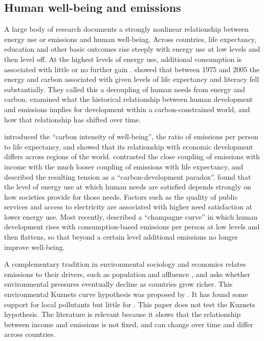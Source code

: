 \subsection{Human well-being and emissions}

A large body of research documents a strongly nonlinear relationship between energy use or emissions and human well-being. Across countries, life expectancy, education and other basic outcomes rise steeply with energy use at low levels and then level off. At the highest levels of energy use, additional consumption is associated with little or no further gain \citep{steinberger2010}. \citet{steinberger2010} showed that between 1975 and 2005 the energy and carbon associated with given levels of life expectancy and literacy fell substantially. They called this a decoupling of human needs from energy and carbon. \citet{lamb2015} examined what the historical relationship between human development and emissions implies for development within a carbon-constrained world, and how that relationship has shifted over time.

\citet{jorgenson2014} introduced the ``carbon intensity of well-being'', the ratio of emissions per person to life expectancy, and showed that its relationship with economic development differs across regions of the world. \citet{steinberger2020} contrasted the close coupling of emissions with income with the much looser coupling of emissions with life expectancy, and described the resulting tension as a ``carbon-development paradox''. \citet{vogel2021} found that the level of energy use at which human needs are satisfied depends strongly on how societies provide for those needs. Factors such as the quality of public services and access to electricity are associated with higher need satisfaction at lower energy use. Most recently, \citet{porcher2026} described a ``champagne curve'' in which human development rises with consumption-based emissions per person at low levels and then flattens, so that beyond a certain level additional emissions no longer improve well-being.

A complementary tradition in environmental sociology and economics relates emissions to their drivers, such as population and affluence \citep{dietz1997}, and asks whether environmental pressures eventually decline as countries grow richer. This environmental Kuznets curve hypothesis was proposed by \citet{grossman1995}. It has found some support for local pollutants but little for \COtwo{} \citep{stern2004}. This paper does not test the Kuznets hypothesis. The literature is relevant because it shows that the relationship between income and emissions is not fixed, and can change over time and differ across countries.

